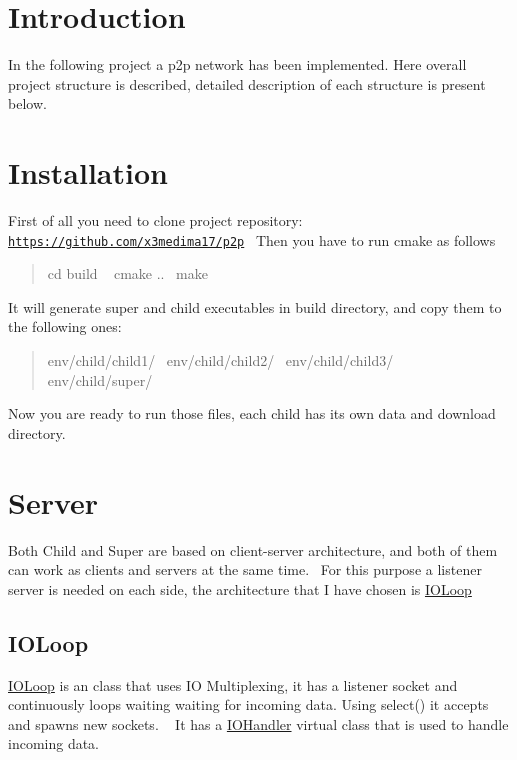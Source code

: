 \hypertarget{index_intro_sec}{}\section{Introduction}\label{index_intro_sec}
In the following project a p2p network has been implemented. Here overall project structure is described, detailed description of each structure is present below.\hypertarget{index_install_sec}{}\section{Installation}\label{index_install_sec}
First of all you need to clone project repository\+: \href{https://github.com/x3medima17/p2p}{\tt https\+://github.\+com/x3medima17/p2p}~\newline
Then you have to run cmake as follows \begin{quote}
cd build ~\newline
cmake ..~\newline
make~\newline
\end{quote}


It will generate {\ttfamily super} and {\ttfamily child} executables in {\ttfamily build} directory, and copy them to the following ones\+: \begin{quote}
env/child/child1/~\newline
env/child/child2/~\newline
env/child/child3/~\newline
env/child/super/~\newline
\end{quote}


Now you are ready to run those files, each child has its own {\ttfamily data} and {\ttfamily download} directory.\hypertarget{index_serv}{}\section{Server}\label{index_serv}
Both Child and Super are based on client-\/server architecture, and both of them can work as clients and servers at the same time.~\newline
For this purpose a listener server is needed on each side, the architecture that I have chosen is \hyperlink{classIOLoop}{I\+O\+Loop} \hypertarget{index_ioloop}{}\subsection{I\+O\+Loop}\label{index_ioloop}
\hyperlink{classIOLoop}{I\+O\+Loop} is an class that uses IO Multiplexing, it has a listener socket and continuously loops waiting waiting for incoming data. Using {\ttfamily select()} it accepts and spawns new sockets. ~\newline
It has a \hyperlink{classIOHandler}{I\+O\+Handler} virtual class that is used to handle incoming data.

